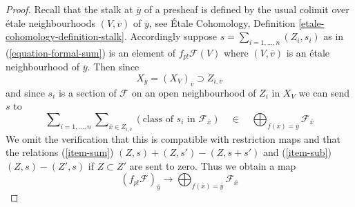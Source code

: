 \documentclass{stacks-project}
\theoremstyle{plain}
\theoremstyle{definition}
\theoremstyle{remark}
\numberwithin{equation}{subsection}
\begin{document}
\begin{proof}
Recall that the stalk at $\overline{y}$ of a presheaf is defined by the
usual colimit over \'etale neighbourhoods $(V, \overline{v})$
of $\overline{y}$, see \'Etale Cohomology, Definition
\ref{etale-cohomology-definition-stalk}. Accordingly
suppose $s = \sum_{i = 1, \ldots, n} (Z_i, s_i)$ as in
(\ref{equation-formal-sum}) is an element of $f_{p!}\mathcal{F}(V)$
where $(V, \overline{v})$ is an \'etale neighbourhood of $\overline{y}$.
Then since
$$
X_{\overline{y}} = (X_V)_{\overline{v}} \supset Z_{i, \overline{v}}
$$
and since $s_i$ is a section of $\mathcal{F}$ on an open neighbourhood
of $Z_i$ in $X_V$ we can send $s$ to
$$
\sum\nolimits_{i = 1, \ldots, n} 
\sum\nolimits_{\overline{x} \in Z_{i, \overline{v}}}
\left(\text{class of }s_i\text{ in }\mathcal{F}_{\overline{x}}\right)
\quad\in\quad
\bigoplus\nolimits_{f(\overline{x}) = \overline{y}} \mathcal{F}_{\overline{x}}
$$
We omit the verification that this is compatible with restriction
maps and that the relations (\ref{item-sum}) $(Z, s) + (Z, s') - (Z, s + s')$
and (\ref{item-sub}) $(Z, s) - (Z', s)$ if $Z \subset Z'$ are sent to zero.
Thus we obtain a map
$$
(f_{p!}\mathcal{F})_{\overline{y}}
\longrightarrow
\bigoplus\nolimits_{f(\overline{x}) = \overline{y}} \mathcal{F}_{\overline{x}}
$$


\end{proof}
\end{document}
